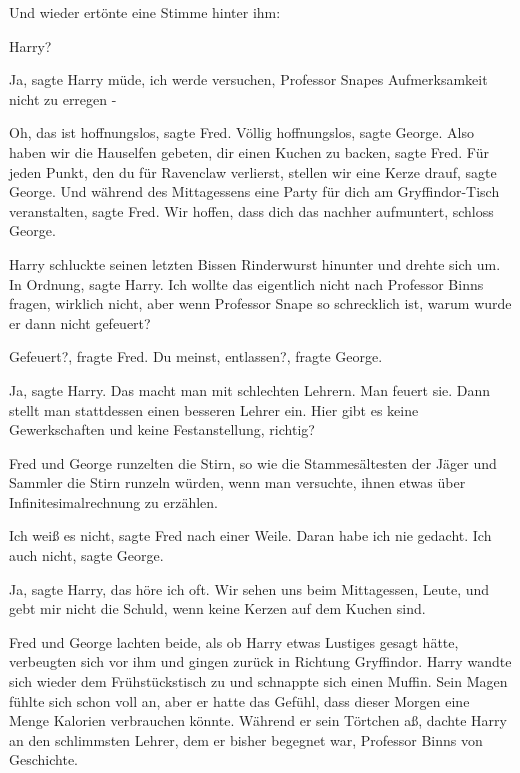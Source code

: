 Und wieder ertönte eine Stimme hinter ihm:

\glqq Harry?\grqq{}

\glqq Ja\grqq{}, sagte Harry müde, \glqq ich werde versuchen, Professor Snapes
Aufmerksamkeit nicht zu erregen -\grqq{}

\glqq Oh, das ist hoffnungslos\grqq{}, sagte Fred. \glqq Völlig
hoffnungslos\grqq{}, sagte George. \glqq Also haben wir die Hauselfen gebeten,
dir einen Kuchen zu backen\grqq{}, sagte Fred. \glqq Für jeden Punkt, den du für
Ravenclaw verlierst, stellen wir eine Kerze drauf\grqq{}, sagte George. \glqq
Und während des Mittagessens eine Party für dich am Gryffindor-Tisch
veranstalten\grqq{}, sagte Fred. \glqq Wir hoffen, dass dich das nachher
aufmuntert\grqq{}, schloss George.

Harry schluckte seinen letzten Bissen Rinderwurst hinunter und drehte sich um.
\glqq In Ordnung\grqq{}, sagte Harry. \glqq Ich wollte das eigentlich nicht nach
Professor Binns fragen, wirklich nicht, aber wenn Professor Snape so schrecklich
ist, warum wurde er dann nicht gefeuert?\grqq{}

\glqq Gefeuert?\grqq{}, fragte Fred. \glqq Du meinst, entlassen?\grqq{}, fragte
George.

\glqq Ja\grqq{}, sagte Harry. \glqq Das macht man mit schlechten Lehrern. Man
feuert sie. Dann stellt man stattdessen einen besseren Lehrer ein. Hier gibt es
keine Gewerkschaften und keine Festanstellung, richtig?\grqq{}

Fred und George runzelten die Stirn, so wie die Stammesältesten der Jäger und
Sammler die Stirn runzeln würden, wenn man versuchte, ihnen etwas über
Infinitesimalrechnung zu erzählen.

\glqq Ich weiß es nicht\grqq{}, sagte Fred nach einer Weile. \glqq Daran habe
ich nie gedacht.\grqq{} \glqq Ich auch nicht\grqq{}, sagte George.

\glqq Ja\grqq{}, sagte Harry, \glqq das höre ich oft. Wir sehen uns beim
Mittagessen, Leute, und gebt mir nicht die Schuld, wenn keine Kerzen auf dem
Kuchen sind.\grqq{}

Fred und George lachten beide, als ob Harry etwas Lustiges gesagt hätte,
verbeugten sich vor ihm und gingen zurück in Richtung Gryffindor. Harry wandte
sich wieder dem Frühstückstisch zu und schnappte sich einen Muffin. Sein Magen
fühlte sich schon voll an, aber er hatte das Gefühl, dass dieser Morgen eine
Menge Kalorien verbrauchen könnte. Während er sein Törtchen aß, dachte Harry an
den schlimmsten Lehrer, dem er bisher begegnet war, Professor Binns von
Geschichte.

